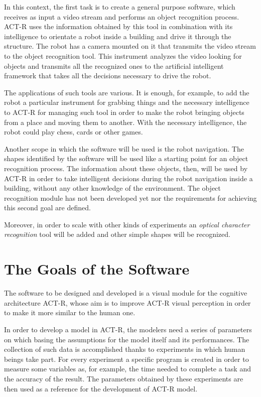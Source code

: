 	In this context, the first task is to create a general purpose software, which receives as input a video stream and performs an object recognition process. \mbox{ACT-R} uses the information obtained by this tool in combination with its intelligence to orientate a robot inside a building and drive it through the structure. The robot has a camera mounted on it that transmits the video stream to the object recognition tool. This instrument analyzes the video looking for objects and transmits all the recognized ones to the artificial intelligent framework that takes all the decisions necessary to drive the robot. 
	
	The applications of such tools are various. 
	It is enough, for example, to add the robot a particular instrument for grabbing things and the necessary intelligence to \mbox{ACT-R} for managing such tool in order to make the robot bringing objects from a place and moving them to another. With the necessary intelligence, the robot could play chess, cards or other games. 
	
	

	Another scope in which the software will be used is the robot navigation. 
	The shapes identified by the software will be used like a starting point for an object recognition process. 
	The information about these objects, then, will be used by ACT-R in order to take intelligent decisions during the robot navigation inside a building, without any other knowledge of the environment. 
	The object recognition module has not been developed yet nor the requirements for achieving this second goal are defined. 	

	Moreover, in order to scale with other kinds of experiments an \emph{optical character recognition} tool will be added and other simple shapes will be recognized.
	

	\section{The Goals of the Software}
	The software to be designed and developed is a visual module for the cognitive architecture ACT-R, whose aim is to improve ACT-R visual perception in order to make it more similar to the human one. 
	
	In order to develop a model in ACT-R, the modelers need a series of parameters on which basing the assumptions for the model itself and its performances.
	The collection of such data is accomplished thanks to experiments in which human beings take part. 
	For every experiment a specific program is created in order to measure some variables as, for example, the time needed to complete a task and the accuracy of the result.
	The parameters obtained by these experiments are then used as a reference for the development of ACT-R model.

